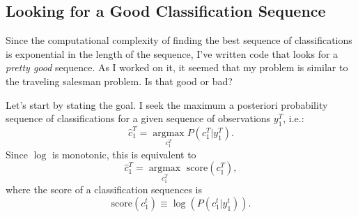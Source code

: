 \documentclass[]{article}
\newcommand{\ts}[3]{#1_{#2}^{#3}}                    %
\newcommand{\argmax}{\operatorname*{argmax}}
\newcommand{\ie}{i.e.\xspace}
\begin{document}
\subsection{Looking for a Good Classification Sequence}\label{good}

Since the computational complexity of finding the best sequence of
classifications is exponential in the length of the sequence, I've
written code that looks for a \emph{pretty good} sequence.  As I worked on
it, it seemed that my problem is similar to the traveling salesman
problem.  Is that good or bad?

Let's start by stating the goal.  I seek the maximum a posteriori
probability sequence of classifications for a given sequence of
observations $\ts{y}{1}{T}$, \ie:
\begin{equation}
  \label{eq:MAPclass}
  \ts{\hat{c}}{1}{T} = \argmax_{\ts{c}{1}{T}}P\left(\ts{c}{1}{T}|\ts{y}{1}{T}\right).
\end{equation}
Since $\log$ is monotonic, this is equivalent to
\begin{equation*}
  \ts{\hat{c}}{1}{T} =
  \argmax_{\ts{c}{1}{T}}\text{ score}(\ts{c}{1}{T}),
\end{equation*}
where the score of a classification sequences is
\begin{equation}
  \label{eq:score}
  \text{score}(\ts{c}{1}{t}) \equiv \log\left(
                               P\left(\ts{c}{1}{t}|\ts{y}{1}{t}\right)
                               \right).
\end{equation}
\end{document}
